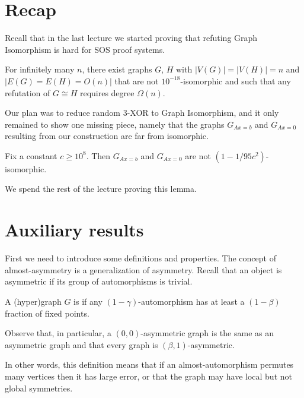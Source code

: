 \documentclass[a4paper,twoside,justified]{tufte-handout}
\newcommand{\PS}{\proofsystem{PC$_>$}}
\newcommand{\Glin}[1]{G_{Ax=#1}}
\begin{document}
 

\section{Recap}

Recall that in the last lecture we started proving that refuting Graph Isomorphism is hard for SOS proof systems.

\begin{theorem}\cite{robustgraphiso}
  \label{th:gi-ps}
  For infinitely many $n$, there exist graphs $G$, $H$ with $|V(G)|=|V(H)|=n$ and $|E(G)=E(H)=O(n)|$ that are not $10^{-18}$-isomorphic and such that any \PS refutation of $G \cong H$ requires degree $\Omega(n)$.
\end{theorem}

Our plan was to reduce random 3-XOR to Graph Isomorphism, and it only remained to show one missing piece, namely that the graphs $\Glin{b}$ and $\Glin{0}$ resulting from our construction are far from isomorphic.

\begin{lemma}
  \label{lem:non-isomorphic}
  Fix a constant $c \geq 10^8$. Then \whp $\Glin{b}$ and $\Glin{0}$ are not $(1-1/95c^2)$-isomorphic.
\end{lemma}

We spend the rest of the lecture proving this lemma.

\section{Auxiliary results}

First we need to introduce some definitions and properties. The concept of almost-asymmetry is a generalization of asymmetry. Recall that an object is asymmetric if its group of automorphisms is trivial.

\begin{definition}
  \label{def:asymmetry} A (hyper)graph $G$ is  if any $(1-\gamma)$-automorphism has at least a $(1-\beta)$ fraction of fixed points.
\end{definition}

Observe that, in particular, a $(0,0)$-asymmetric graph is the same as an asymmetric graph and that every graph is $(\beta,1)$-asymmetric.

In other words, this definition means that if an almost-automorphism permutes many vertices then it has large error, or that the graph may have local but not global symmetries.
\end{document}
